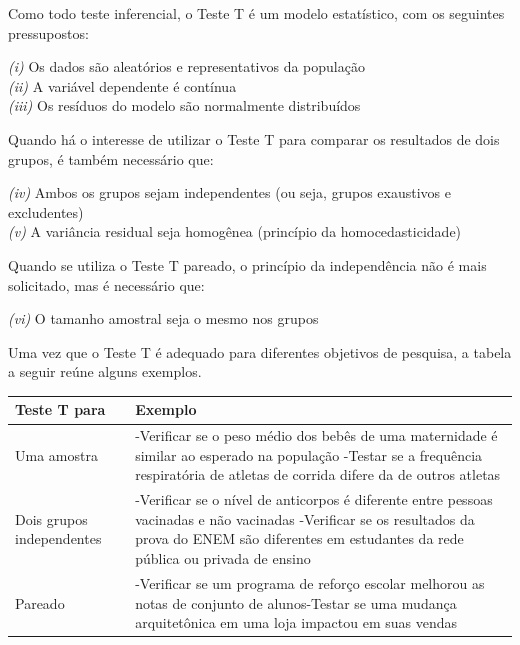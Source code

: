 \documentclass[
]{book}
\begin{document}
Como todo teste inferencial, o Teste T é um modelo estatístico, com os seguintes pressupostos:

\emph{(i)} Os dados são aleatórios e representativos da população\\
\emph{(ii)} A variável dependente é contínua\\
\emph{(iii)} Os resíduos do modelo são normalmente distribuídos

Quando há o interesse de utilizar o Teste T para comparar os resultados de dois grupos, é também necessário que:

\emph{(iv)} Ambos os grupos sejam independentes (ou seja, grupos exaustivos e excludentes)\\
\emph{(v)} A variância residual seja homogênea (princípio da homocedasticidade)

Quando se utiliza o Teste T pareado, o princípio da independência não é mais solicitado, mas é necessário que:

\emph{(vi)} O tamanho amostral seja o mesmo nos grupos

Uma vez que o Teste T é adequado para diferentes objetivos de pesquisa, a tabela a seguir reúne alguns exemplos.

\begin{longtable}[]{@{}ll@{}}
\toprule
\begin{minipage}[b]{0.47\columnwidth}\raggedright
Teste T para\strut
\end{minipage} & \begin{minipage}[b]{0.47\columnwidth}\raggedright
Exemplo\strut
\end{minipage}\tabularnewline
\midrule
\endhead
\begin{minipage}[t]{0.47\columnwidth}\raggedright
Uma amostra\strut
\end{minipage} & \begin{minipage}[t]{0.47\columnwidth}\raggedright
-Verificar se o peso médio dos bebês de uma maternidade é similar ao esperado na população -Testar se a frequência respiratória de atletas de corrida difere da de outros atletas\strut
\end{minipage}\tabularnewline
\begin{minipage}[t]{0.47\columnwidth}\raggedright
Dois grupos independentes\strut
\end{minipage} & \begin{minipage}[t]{0.47\columnwidth}\raggedright
-Verificar se o nível de anticorpos é diferente entre pessoas vacinadas e não vacinadas -Verificar se os resultados da prova do ENEM são diferentes em estudantes da rede pública ou privada de ensino\strut
\end{minipage}\tabularnewline
\begin{minipage}[t]{0.47\columnwidth}\raggedright
Pareado\strut
\end{minipage} & \begin{minipage}[t]{0.47\columnwidth}\raggedright
-Verificar se um programa de reforço escolar melhorou as notas de conjunto de alunos-Testar se uma mudança arquitetônica em uma loja impactou em suas vendas\strut
\end{minipage}\tabularnewline
\bottomrule
\end{longtable}
\end{document}
